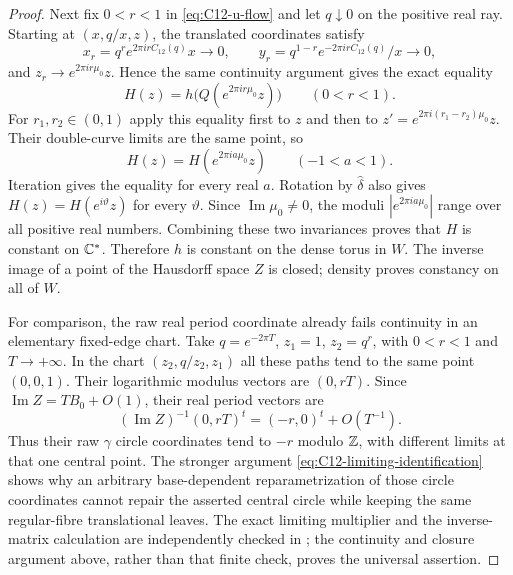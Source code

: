 \begin{proof}
Next fix $0<r<1$ in \eqref{eq:C12-u-flow} and let $q\downarrow0$
on the positive real ray. Starting at $(x,q/x,z)$, the translated
coordinates satisfy
\[
 x_r=q^r e^{2\pi i r C_{12}(q)}x\longrightarrow0,\qquad
 y_r=q^{1-r} e^{-2\pi i r C_{12}(q)}/x\longrightarrow0,
\]
and $z_r\longrightarrow e^{2\pi i r\mu_0}z$. Hence the same
continuity argument gives the exact equality
\begin{equation}\label{eq:C12-limiting-identification}
 H(z)=h\bigl(Q(e^{2\pi i r\mu_0}z)\bigr)
 \qquad(0<r<1).
\end{equation}
For $r_1,r_2\in(0,1)$ apply this equality first to $z$ and
then to $z'=e^{2\pi i(r_1-r_2)\mu_0}z$. Their double-curve
limits are the same point, so
\[
 H(z)=H(e^{2\pi i a\mu_0}z)\qquad(-1<a<1).
\]
Iteration gives the equality for every real $a$. Rotation by
$\widehat\delta$ also gives $H(z)=H(e^{i\vartheta}z)$ for every
$\vartheta$. Since $\operatorname{Im}\mu_0\ne0$, the moduli
$|e^{2\pi i a\mu_0}|$ range over all positive real numbers.
Combining these two invariances proves that $H$ is constant on
$\mathbb C^*$. Therefore $h$ is constant on the dense torus in $W$.
The inverse image of a point of the Hausdorff space $Z$ is
closed; density proves constancy on all of $W$.

For comparison, the raw real period coordinate already fails
continuity in an elementary fixed-edge chart. Take
$q=e^{-2\pi T}$, $z_1=1$, $z_2=q^r$, with $0<r<1$ and
$T\to+\infty$. In the chart
$(z_2,q/z_2,z_1)$ all these paths tend to the same point
$(0,0,1)$. Their logarithmic modulus vectors are $(0,rT)$.
Since $\operatorname{Im}Z=TB_0+O(1)$, their real period
vectors are
\[
 (\operatorname{Im}Z)^{-1}(0,rT)^t
                  =(-r,0)^t+O(T^{-1}).
\]
Thus their raw $\gamma$ circle coordinates tend to $-r$ modulo
$\mathbb Z$, with different limits at that one central point. The
stronger argument \eqref{eq:C12-limiting-identification} shows
why an arbitrary base-dependent reparametrization of those
circle coordinates cannot repair the asserted central circle
while keeping the same regular-fibre translational leaves.
The exact limiting multiplier and the inverse-matrix calculation
are independently checked in
; the continuity
and closure argument above, rather than that finite check,
proves the universal assertion.
\end{proof}
